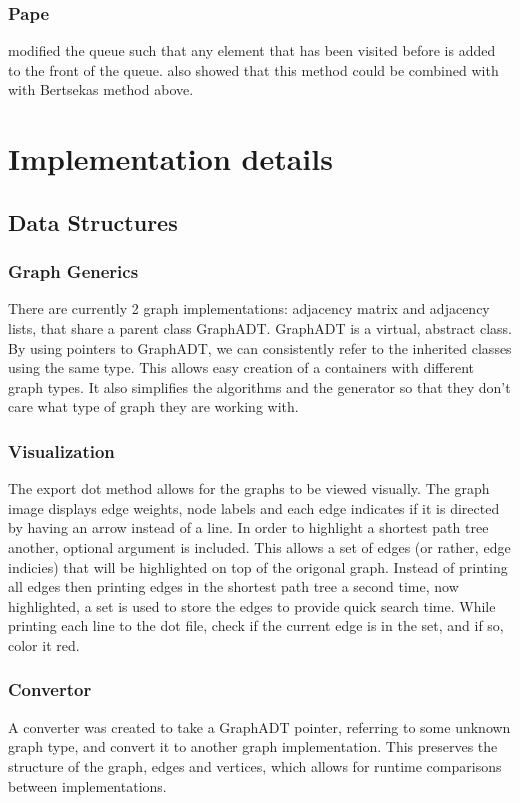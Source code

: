 \documentclass{article}
\begin{document}
\subsubsection{Pape}
\cite{Pape} modified the queue such that any element that has been visited before is added to the front of the queue. \cite{Hao} also showed that this method could be combined with with Bertsekas method above. 

\section{Implementation details}
\subsection{Data Structures}
\subsubsection{Graph Generics}
There are currently 2 graph implementations: adjacency matrix and adjacency lists, that share a parent class GraphADT. GraphADT is a virtual, abstract class. By using pointers to GraphADT, we can consistently refer to the inherited classes using the same type. This allows easy creation of a containers with different graph types. It also simplifies the algorithms and the generator so that they don't care what type of graph they are working with.
\subsubsection{Visualization}
The export dot method allows for the graphs to be viewed visually. The graph image displays edge weights, node labels and each edge indicates if it is directed by having an arrow instead of a line. In order to highlight a shortest path tree another, optional argument is included. This allows a set of edges (or rather, edge indicies) that will be highlighted on top of the origonal graph. Instead of printing all edges then printing edges in the shortest path tree a second time, now highlighted, a set is used to store the edges to provide quick search time. While printing each line to the dot file, check if the current edge is in the set, and if so, color it red. 
\subsubsection{Convertor}
A converter was created to take a GraphADT pointer, referring to some unknown graph type, and convert it to another graph implementation. This preserves the structure of the graph, edges and vertices, which allows for runtime comparisons between implementations.
\end{document}
